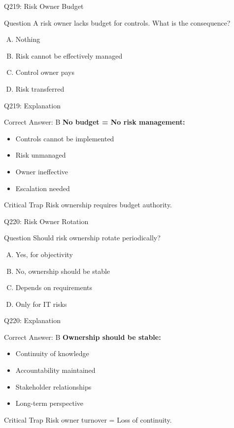 \documentclass{beamer}
\begin{document}
	\begin{frame}{Q219: Risk Owner Budget}
		\begin{block}{Question}
			A risk owner lacks budget for controls. What is the consequence?
		\end{block}
		\begin{enumerate}[(A)]
			\item Nothing
			\item Risk cannot be effectively managed
			\item Control owner pays
			\item Risk transferred
		\end{enumerate}
	\end{frame}
	
	\begin{frame}{Q219: Explanation}
		\begin{block}{Correct Answer: B}
			\textbf{No budget = No risk management:}
			\begin{itemize}
				\item Controls cannot be implemented
				\item Risk unmanaged
				\item Owner ineffective
				\item Escalation needed
			\end{itemize}
		\end{block}
		\begin{alertblock}{Critical Trap}
			Risk ownership requires budget authority.
		\end{alertblock}
	\end{frame}
	
	\begin{frame}{Q220: Risk Owner Rotation}
		\begin{block}{Question}
			Should risk ownership rotate periodically?
		\end{block}
		\begin{enumerate}[(A)]
			\item Yes, for objectivity
			\item No, ownership should be stable
			\item Depends on requirements
			\item Only for IT risks
		\end{enumerate}
	\end{frame}
	
	\begin{frame}{Q220: Explanation}
		\begin{block}{Correct Answer: B}
			\textbf{Ownership should be stable:}
			\begin{itemize}
				\item Continuity of knowledge
				\item Accountability maintained
				\item Stakeholder relationships
				\item Long-term perspective
			\end{itemize}
		\end{block}
		\begin{alertblock}{Critical Trap}
			Risk owner turnover = Loss of continuity.
		\end{alertblock}
	\end{frame}
	
\end{document}
